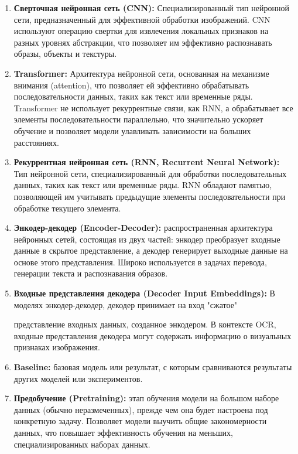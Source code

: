 \begin{enumerate}
    \item \textbf{Сверточная нейронная сеть (CNN):} Специализированный тип нейронной сети, предназначенный для эффективной обработки изображений. CNN используют операцию свертки для извлечения локальных признаков на разных уровнях абстракции, что позволяет им эффективно распознавать образы, объекты и текстуры.
    
    \item \textbf{Transformer:} Архитектура нейронной сети, основанная на механизме внимания (attention), что позволяет ей эффективно обрабатывать последовательности данных, таких как текст или временные ряды. Transformer не использует рекуррентные связи, как RNN, а обрабатывает все элементы последовательности параллельно, что значительно ускоряет обучение и позволяет модели улавливать зависимости на больших расстояниях. 

    \item \textbf{Рекуррентная нейронная сеть (RNN, Recurrent Neural Network):}  Тип  нейронной  сети,  специализированный  для  обработки  последовательных  данных,  таких  как  текст  или  временные  ряды.  RNN  обладают  памятью,  позволяющей  им  учитывать  предыдущие  элементы  последовательности  при  обработке  текущего  элемента.

    \item \textbf{Энкодер-декодер (Encoder-Decoder):}  распространенная архитектура нейронных сетей, состоящая из двух частей:  энкодер преобразует входные данные в скрытое представление, а декодер  генерирует выходные данные на основе этого представления.  Широко используется в задачах перевода,  генерации текста и распознавания образов.

    \item  \textbf{Входные представления декодера (Decoder Input Embeddings):} В моделях энкодер-декодер, декодер принимает на вход  "сжатое"
    
    представление входных данных, созданное энкодером.  В контексте OCR,  входные представления декодера  могут содержать информацию о визуальных  признаках  изображения.

    \item  \textbf{Baseline:} базовая модель или результат, с которым сравниваются результаты  других моделей или  экспериментов. 

    \item  \textbf{Предобучение (Pretraining):}  этап обучения модели на большом наборе данных (обычно неразмеченных),  прежде чем она будет настроена под конкретную задачу.  Позволяет модели  выучить общие закономерности данных, что  повышает  эффективность  обучения на меньших, специализированных наборах данных.


\end{enumerate}
